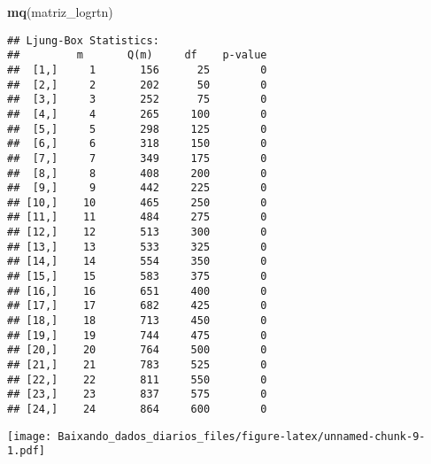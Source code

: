 \documentclass[]{article}
\newenvironment{Shaded}{\begin{snugshade}}{\end{snugshade}}
\newcommand{\KeywordTok}[1]{\textcolor[rgb]{0.13,0.29,0.53}{\textbf{{#1}}}}
\newcommand{\NormalTok}[1]{{#1}}
\begin{document}
\begin{Shaded}
\begin{Highlighting}[]
\KeywordTok{mq}\NormalTok{(matriz_logrtn)}
\end{Highlighting}
\end{Shaded}

\begin{verbatim}
## Ljung-Box Statistics:  
##         m       Q(m)     df    p-value
##  [1,]     1       156      25        0
##  [2,]     2       202      50        0
##  [3,]     3       252      75        0
##  [4,]     4       265     100        0
##  [5,]     5       298     125        0
##  [6,]     6       318     150        0
##  [7,]     7       349     175        0
##  [8,]     8       408     200        0
##  [9,]     9       442     225        0
## [10,]    10       465     250        0
## [11,]    11       484     275        0
## [12,]    12       513     300        0
## [13,]    13       533     325        0
## [14,]    14       554     350        0
## [15,]    15       583     375        0
## [16,]    16       651     400        0
## [17,]    17       682     425        0
## [18,]    18       713     450        0
## [19,]    19       744     475        0
## [20,]    20       764     500        0
## [21,]    21       783     525        0
## [22,]    22       811     550        0
## [23,]    23       837     575        0
## [24,]    24       864     600        0
\end{verbatim}

\texttt{[image: Baixando\_dados\_diarios\_files/figure-latex/unnamed-chunk-9-1.pdf]}

\hypertarget{refs}{}
\end{document}
